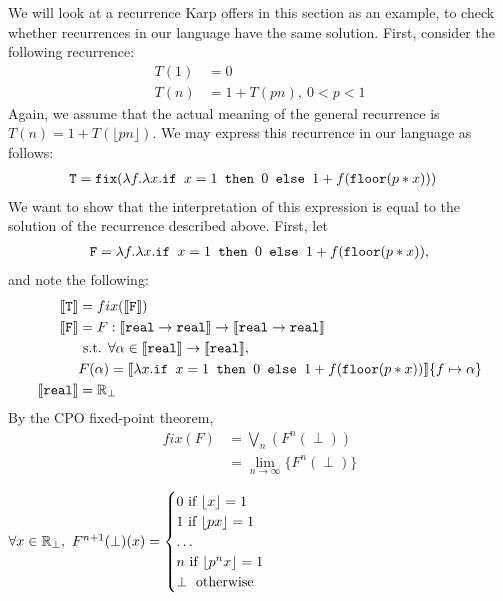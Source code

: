 We will look at a recurrence Karp offers in this section as an example, to check whether recurrences in our 
language have the same solution. First, consider the following recurrence:
\begin{align*}
T(1) &= 0 \\
T(n) &= 1 + T(pn), \ 0 < p < 1
\end{align*} 
Again, we assume that the actual meaning of the general recurrence is $T(n) = 1 + T(\lfloor pn \rfloor)$.
We may express this recurrence in our language as follows:
\begin{align*}
\texttt{T} &= \texttt{fix}(\lambda f. \lambda x.\texttt{if } x=1 \texttt{ then } 0 \texttt{ else } 1 + f(\texttt{floor}(p*x)))
 \end{align*}
 We want to show that the interpretation of this expression is equal to the solution of the recurrence described above. 
 First, let 
 \begin{align*}
 \texttt{F} =\lambda f. \lambda x.\texttt{if } x=1 \texttt{ then } 0 \texttt{ else } 1 + f(\texttt{floor}(p*x)),
 \end{align*}
 and note the following: 
 \begin{align*}
 \llbracket \texttt{T} \rrbracket &= fix(\llbracket \texttt{F} \rrbracket) \\
 \llbracket \texttt{F} \rrbracket &= F : \llbracket \texttt{real} \rightarrow \texttt{real}\rrbracket \rightarrow \llbracket \texttt{real} \rightarrow \texttt{real}\rrbracket \\ 
 &\text{ s.t. } \forall \alpha \in \llbracket \texttt{real}\rrbracket \rightarrow \llbracket \texttt{real} \rrbracket, \\   
 &F(\alpha) = \llbracket\lambda x.\texttt{if } x=1 \texttt{ then } 0 \texttt{ else } 1 + f(\texttt{floor}(p*x))\rrbracket\{f \mapsto \alpha\} \\
 \llbracket \texttt{real}\rrbracket &= \mathbb{R}_{\perp}  
 \end{align*}
 By the CPO fixed-point theorem,  
\begin{align*}
 fix(F) &= \bigvee_n(F^n (\perp)) \\
&= \lim_{n \to \infty}\{F^n (\perp)\}
 \end{align*}
 \begin{lemma}
 $\forall x \in \R_{\perp}, \ F^{n+1}(\perp)(x) =  
 \begin{cases}
 0 \text{ if }\lfloor x \rfloor = 1  \\
 1 \text{ if } \lfloor px  \rfloor= 1 \\
 \dots \\
 n  \text{ if }  \lfloor p^{n}x \rfloor = 1  \\
 \perp \text{ otherwise}
 \end{cases}$
 \end{lemma}
